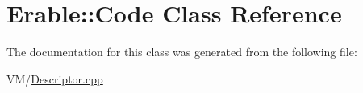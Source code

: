 \hypertarget{class_erable_1_1_code}{}\section{Erable\+::Code Class Reference}
\label{class_erable_1_1_code}


The documentation for this class was generated from the following file\+:\begin{DoxyCompactItemize}
\item 
V\+M/\mbox{\hyperlink{_descriptor_8cpp}{Descriptor.\+cpp}}\end{DoxyCompactItemize}

